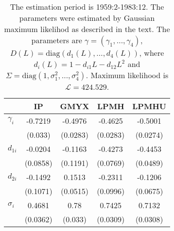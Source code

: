 \begin{table}[h!]
\centering\captionsetup{width=0.8\textwidth, font=small}
\caption{The estimation period is 1959:2-1983:12. The parameters were estimated by Gaussian maximum likelihod as described in the text. The parameters are $\gamma = (\gamma_1,\ldots, \gamma_4)$, $D(L)=\text{diag}\left(d_1(L),\ldots, d_4(L)\right)$, where $d_i(L) = 1-d_{i1}L - d_{12}L^2$ and $\Sigma = \text{diag} \left(1,\sigma_1^2,\ldots,\sigma_4^2\right)$. Maximum likelihood is $\mathcal{L}=424.529$.}\label{tab:sw_ml-params}
\begin{tabular}{l|cccc}
&IP&GMYX&LPMH&LPMHU\\\hline\hline
$\gamma_i$&-0.7219&-0.4976&-0.4625&-0.5001\\
&(0.033)&(0.0283)&(0.0283)&(0.0274)\\
$d_{1i}$&-0.0204&-0.1163&-0.4273&-0.4453\\
&(0.0858)&(0.1191)&(0.0769)&(0.0489)\\
$d_{2i}$&-0.1492&0.1513&-0.2311&-0.1206\\
&(0.1071)&(0.0515)&(0.0996)&(0.0675)\\
$\sigma_i$&0.4681&0.78&0.7425&0.7132\\&(0.0362)&(0.033)&(0.0309)&(0.0308)\\\hline\hline
\end{tabular}
\end{table}